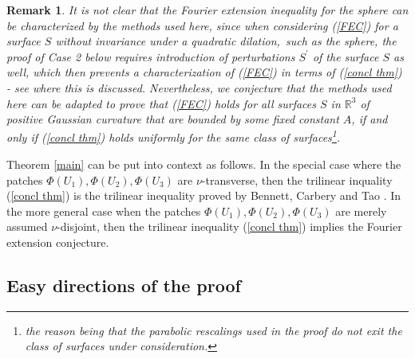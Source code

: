 \documentclass{amsart}%
\theoremstyle{plain}
\newtheorem{remark}[theorem]{Remark}
\numberwithin{equation}{section}
\begin{document}
\begin{remark}
It is not clear that the Fourier extension inequality for the \emph{sphere}
can be characterized by the methods used here, since when considering
(\ref{FEC}) for a surface $S$ without invariance under a quadratic
dilation,\ such as the sphere, the proof of Case 2 below requires introduction
of perturbations $S^{\prime}$ of the surface $S$ as well, which then prevents
a characterization of (\ref{FEC}) in terms of (\ref{concl thm}) - see
\cite[page 297]{TaVaVe} where this is discussed. Nevertheless, we conjecture
that the methods used here can be adapted to prove that (\ref{FEC}) holds for
\emph{all} surfaces $S$ in $\mathbb{R}^{3}$ of positive Gaussian curvature
that are bounded by some fixed constant $A$, if and only if (\ref{concl thm})
holds uniformly for the same class of surfaces\footnote{the reason being that
the parabolic rescalings used in the proof do not exit the class of surfaces
under consideration.}.
\end{remark}

Theorem \ref{main} can be put into context as follows. In the special case
where the patches $\Phi\left(  U_{1}\right)  ,\Phi\left(  U_{2}\right)
,\Phi\left(  U_{3}\right)  $ are $\nu$-transverse, then the trilinear
inquality (\ref{concl thm}) is the trilinear inequality proved by Bennett,
Carbery and Tao \cite{BeCaTa}. In the more general case when the patches
$\Phi\left(  U_{1}\right)  ,\Phi\left(  U_{2}\right)  ,\Phi\left(
U_{3}\right)  $ are merely assumed $\nu$-disjoint, then the trilinear
inequality (\ref{concl thm}) implies the Fourier extension conjecture.

\subsection{Easy directions of the proof}
\end{document}
